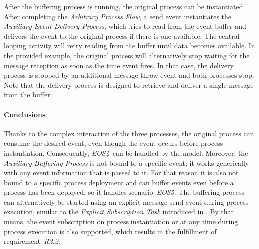 After the buffering process is running, the original process can be instantiated. 
After completing the \textit{Arbitrary Process Flow}, a send event instantiates the \textit{Auxiliary Event Delivery Process}, which tries to read from the event buffer and delivers the event to the original process if there is one available. 
The central looping activity will retry reading from the buffer until data becomes available.
In the provided example, the original process will alternatively stop waiting for the message reception as soon as the time event fires. In that case, the delivery process is stopped by an additional message throw event and both processes stop.
Note that the delivery process is designed to retrieve and deliver a single message from the buffer.

\paragraph{Conclusions}
Thanks to the complex interaction of the three processes, the original process can consume the desired event, even though the event occurs before process instantiation. Consequently, \textit{EOS4}~can be handled by the model. 
Moreover, the \textit{Auxiliary Buffering Process} is not bound to a specific event, it works generically with any event information that is passed to it. For that reason it is also not bound to a specific process deployment and can buffer events even before a process has been deployed, so it handles scenario~\textit{EOS5}.
The buffering process can alternatively be started using an explicit message send event during process execution, similar to the \textit{Explicit Subscription Task} introduced in \cite{mandal:2017}. By that means, the event subscription on process instantiation or at any time during process execution is also supported, which results in the fulfillment of requirement~\textit{R2.2}.

